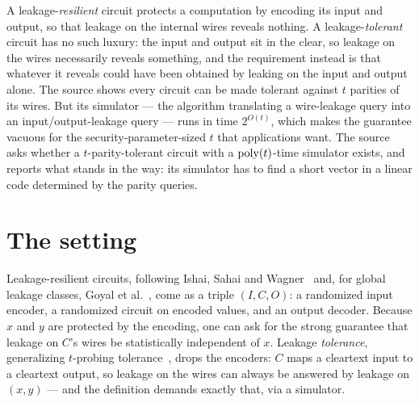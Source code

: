 \documentclass{aicr-conjecture}
\begin{document}

\vspace{0.4em}

\begin{informalconjecture}
A leakage-\emph{resilient} circuit protects a computation by encoding
its input and output, so that leakage on the internal wires reveals
nothing. A leakage-\emph{tolerant} circuit has no such luxury: the input
and output sit in the clear, so leakage on the wires necessarily reveals
something, and the requirement instead is that whatever it reveals could
have been obtained by leaking on the input and output alone. The source
shows every circuit can be made tolerant against $t$ parities of its
wires. But its simulator --- the algorithm translating a wire-leakage
query into an input/output-leakage query --- runs in time $2^{O(t)}$,
which makes the guarantee vacuous for the security-parameter-sized $t$
that applications want. The source asks whether a $t$-parity-tolerant
circuit with a $\mathrm{poly}(t)$-time simulator exists, and reports what stands
in the way: its simulator has to find a short vector in a linear code
determined by the parity queries.
\end{informalconjecture}

\section{The setting}\label{sec:setting}

Leakage-resilient circuits, following Ishai, Sahai and
Wagner~\cite{ISW03} and, for global leakage classes, Goyal et
al.~\cite{GIM+16}, come as a triple $(I, C, O)$: a randomized input
encoder, a randomized circuit on encoded values, and an output decoder.
Because $x$ and $y$ are protected by the encoding, one can ask for the
strong guarantee that leakage on $C$'s wires be statistically
independent of $x$. Leakage \emph{tolerance}, generalizing $t$-probing
tolerance~\cite{ISW03,AIS18,GIS22}, drops the encoders: $C$ maps a
cleartext input to a cleartext output, so leakage on the wires can
always be answered by leakage on $(x,y)$ --- and the definition demands
exactly that, via a simulator.
\end{document}
